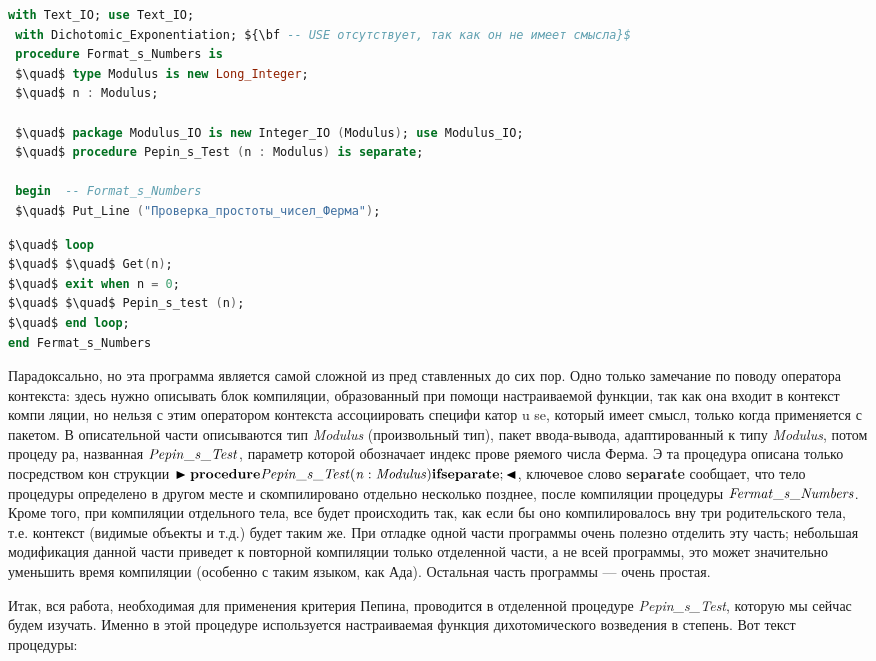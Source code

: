  \begin{lstlisting}[mathescape=true, language=Ada, basicstyle=\small]
 with Text_IO; use Text_IO;
 with Dichotomic_Exponentiation; ${\bf -- USE отсутствует, так как он не имеет смысла}$
 procedure Format_s_Numbers is
 $\quad$ type Modulus is new Long_Integer;
 $\quad$ n : Modulus;
 
 $\quad$ package Modulus_IO is new Integer_IO (Modulus); use Modulus_IO;
 $\quad$ procedure Pepin_s_Test (n : Modulus) is separate;
 
 begin  -- Format_s_Numbers
 $\quad$ Put_Line ("Проверка_простоты_чисел_Ферма");
 \end{lstlisting}
 
 \newpage

\begin{lstlisting}[mathescape=true, language=Ada, basicstyle=\small]
$\quad$ loop
$\quad$ $\quad$ Get(n);
$\quad$ exit when n = 0;
$\quad$ $\quad$ Pepin_s_test (n);
$\quad$ end loop;
end Fermat_s_Numbers
\end{lstlisting}
 
 \par Парадоксально, но эта программа является самой сложной из пред­
ставленных до сих пор. Одно только замечание по поводу оператора
контекста: здесь нужно описывать блок компиляции, образованный при
помощи настраиваемой функции, так как она входит в контекст компи­
ляции, но нельзя с этим оператором контекста ассоциировать специфи­
катор u se, который имеет смысл, только когда применяется с пакетом.
В описательной части описываются тип {\it Modulus} (произвольный тип),
пакет ввода-вывода, адаптированный к типу {\it Modulus}, потом процеду­
ра, названная ${\it Pepin\_ s\_ Test}$, параметр которой обозначает индекс прове­
ряемого числа Ферма. Э та процедура описана только посредством кон­
струкции $\blacktriangleright {\bf procedure} {\it Pepin\_ s\_ Test (n:Modulus)} {\bf if separate}; \blacktriangleleft$, ключевое слово {\bf separate} сообщает, что тело процедуры определено в другом
месте и скомпилировано отдельно несколько позднее, после компиляции
процедуры ${\it Fermat\_ s\_ Numbers}$. Кроме того, при компиляции отдельного
тела, все будет происходить так, как если бы оно компилировалось вну­
три родительского тела, т.е. контекст (видимые объекты и т.д.) будет
таким же. При отладке одной части программы очень полезно отделить
эту часть; небольшая модификация данной части приведет к повторной
компиляции только отделенной части, а не всей программы, это может
значительно уменьшить время компиляции (особенно с таким языком,
как Ада). Остальная часть программы — очень простая.
\par Итак, вся работа, необходимая для применения критерия Пепина,
проводится в отделенной процедуре {\it Pepin\_s\_Test}, которую мы сейчас
будем изучать. Именно в этой процедуре используется настраиваемая
функция дихотомического возведения в степень. Вот текст процедуры:

